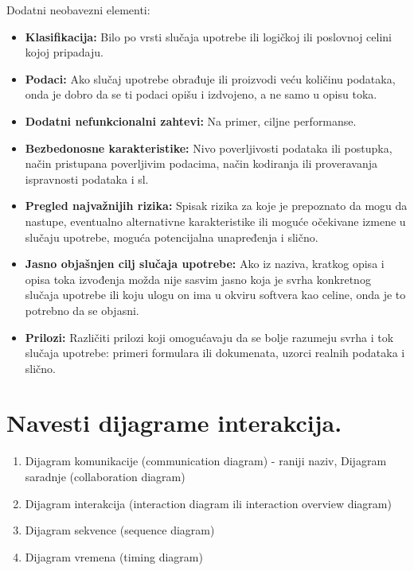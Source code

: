\documentclass[a4paper]{article}
\begin{document}
Dodatni neobavezni elementi:
\begin{itemize}
    \item \textbf{Klasifikacija:} Bilo po vrsti slučaja upotrebe ili logičkoj ili poslovnoj celini kojoj pripadaju.
    \item \textbf{Podaci:} Ako slučaj upotrebe obrađuje ili proizvodi veću količinu podataka, onda je dobro da se ti podaci opišu i izdvojeno, a ne samo u opisu toka.
    \item \textbf{Dodatni nefunkcionalni zahtevi:} Na primer, ciljne performanse.
    \item \textbf{Bezbedonosne karakteristike:} Nivo poverljivosti podataka ili postupka, način pristupana poverljivim podacima, način kodiranja ili proveravanja ispravnosti podataka i sl.
    \item \textbf{Pregled najvažnijih rizika:} Spisak rizika za koje je prepoznato da mogu da nastupe, eventualno alternativne karakteristike ili moguće očekivane izmene u slučaju upotrebe, moguća potencijalna unapređenja i slično.
    \item \textbf{Jasno objašnjen cilj slučaja upotrebe:} Ako iz naziva, kratkog opisa i opisa toka izvođenja možda nije sasvim jasno koja je svrha konkretnog slučaja upotrebe ili koju ulogu on ima u okviru softvera kao celine, onda je to potrebno da se objasni.
    \item \textbf{Prilozi:} Različiti prilozi koji omogućavaju da se bolje razumeju svrha i tok slučaja upotrebe: primeri formulara ili dokumenata, uzorci realnih podataka i slično.
\end{itemize}


\section{Navesti dijagrame interakcija.}
  \begin{enumerate}
    \item Dijagram komunikacije (communication diagram) 
          - raniji naziv, Dijagram saradnje (collaboration diagram)
    \item Dijagram interakcija (interaction diagram ili interaction overview diagram)
    \item Dijagram sekvence (sequence diagram)
    \item Dijagram vremena (timing diagram)
  \end{enumerate}
\end{document}
